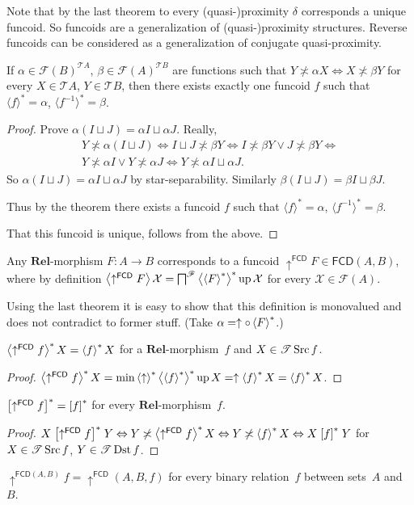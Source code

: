 Note that by the last theorem to every (quasi-)proximity $\delta$ corresponds
a unique funcoid. So funcoids are a generalization of (quasi-)proximity
structures. Reverse funcoids can be considered as a generalization
of conjugate quasi-proximity.
\begin{cor}
If $\alpha\in\mathscr{F}(B)^{\mathscr{T}A}$,
$\beta\in\mathscr{F}(A)^{\mathscr{T}B}$
are functions such that $Y\nasymp\alpha X\Leftrightarrow X\nasymp\beta Y$
for every $X\in\mathscr{T}A$, $Y\in\mathscr{T}B$, then there exists
exactly one funcoid $f$ such that $\langle f\rangle^{\ast}=\alpha$,
$\langle f^{-1}\rangle^{\ast}=\beta$.\end{cor}
\begin{proof}
Prove $\alpha(I\sqcup J)=\alpha I\sqcup\alpha J$. Really,
\begin{multline*}
Y\nasymp\alpha(I\sqcup J)\Leftrightarrow I\sqcup J\nasymp\beta Y\Leftrightarrow
I\nasymp\beta Y\vee J\nasymp\beta Y\Leftrightarrow\\ Y\nasymp\alpha I\vee
Y\nasymp\alpha J\Leftrightarrow Y\nasymp\alpha I\sqcup\alpha J.
\end{multline*}
So $\alpha(I\sqcup J)=\alpha I\sqcup\alpha J$ by star-separability.
Similarly $\beta(I\sqcup J)=\beta I\sqcup\beta J$.

Thus by the theorem there exists a funcoid $f$ such that $\langle
f\rangle^{\ast}=\alpha$,
$\langle f^{-1}\rangle^{\ast}=\beta$.

That this funcoid is unique, follows from the above.\end{proof}
\begin{defn}
Any $\mathbf{Rel}$-morphism $F:A\rightarrow B$ corresponds to a
funcoid $\uparrow^{\mathsf{FCD}}F\in\mathsf{FCD}(A,B)$, where by
definition
$\left\langle \uparrow^{\mathsf{FCD}}F\right\rangle\mathcal{X}=\bigsqcap^{\mathscr{F}}\left\langle 
\left\langle F\right\rangle ^{\ast}\right\rangle ^{\ast}\operatorname{up}\mathcal{X}$
for every $\mathcal{X}\in\mathscr{F}(A)$.
\end{defn}
Using the last theorem it is easy to show that this definition is
monovalued and does not contradict to former stuff. (Take
$\alpha=\uparrow\circ\left\langle F\right\rangle ^{\ast}$.)
\begin{prop}
$\left\langle \uparrow^{\mathsf{FCD}}f\right\rangle ^{\ast}X=\left\langle f\right\rangle ^{\ast}X$ for a
$\mathbf{Rel}$-morphism~$f$
and $X\in\mathscr{T}\operatorname{Src} f$.\end{prop}
\begin{proof}
$\left\langle \uparrow^{\mathsf{FCD}}f\right\rangle ^{\ast}X=\min\left\langle \uparrow\right\rangle ^{\ast}\left\langle \left\langle f\right\rangle ^{\ast}\right\rangle ^{\ast}\operatorname{up} X=\uparrow\left\langle f\right\rangle ^{\ast}X=\left\langle f\right\rangle ^{\ast}X$.\end{proof}
\begin{cor}
$\mathord{\mathrel{\left[\uparrow^{\mathsf{FCD}}f\right]^{\ast}}}=\mathord{\mathrel{\left[f\right]^{\ast}}}$
for every $\mathbf{Rel}$-morphism~$f$.\end{cor}
\begin{proof}
$X\mathrel{\left[\uparrow^{\mathsf{FCD}}f\right]^{\ast}}Y\Leftrightarrow
Y\not\asymp\left\langle \uparrow^{\mathsf{FCD}}f\right\rangle ^{\ast}X\Leftrightarrow Y\not\asymp\left\langle f\right\rangle ^{\ast}X\Leftrightarrow X\mathrel{\left[f\right]^{\ast}}Y$
for $X\in\mathscr{T}\operatorname{Src} f$, $Y\in\mathscr{T}\operatorname{Dst} f$.\end{proof}
\begin{defn}
$\uparrow^{\mathsf{FCD}(A,B)}f=\uparrow^{\mathsf{FCD}}(A,B,f)$ for
every binary relation~$f$ between sets~$A$ and~$B$.
\end{defn}

